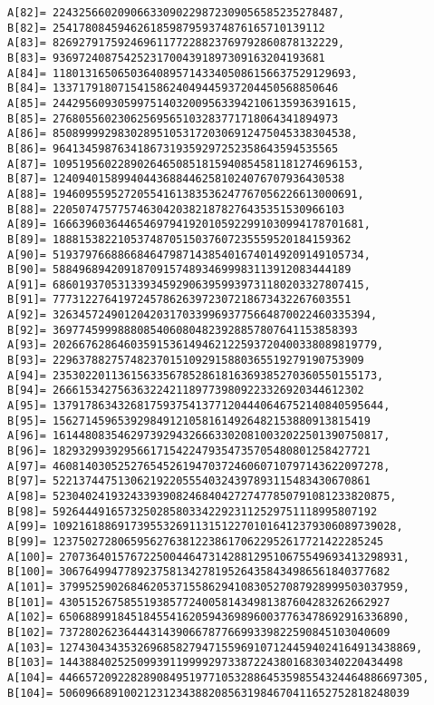 \documentclass[a4paper]{article}
\begin{document}
\begin{verbatim}
A[82]= 22432566020906633090229872309056585235278487, 
B[82]= 254178084594626185987959374876165710139112
A[83]= 82692791759246961177228823769792860878132229, 
B[83]= 936972408754252317004391897309163204193681
A[84]= 1180131650650364089571433405086156637529129693, 
B[84]= 13371791807154158624049445937204450568850646
A[85]= 2442956093059975140320095633942106135936391615, 
B[85]= 27680556023062569565103283771718064341894973
A[86]= 8508999929830289510531720306912475045338304538, 
B[86]= 96413459876341867319359297252358643594535565
A[87]= 10951956022890264650851815940854581181274696153, 
B[87]= 124094015899404436884462581024076707936430538
A[88]= 19460955952720554161383536247767056226613000691, 
B[88]= 220507475775746304203821878276435351530966103
A[89]= 166639603644654697941920105922991030994178701681, 
B[89]= 1888153822105374870515037607235559520184159362
A[90]= 519379766886684647987143854016740149209149105734, 
B[90]= 5884968942091870915748934699983113912083444189
A[91]= 686019370531339345929063959939731180203327807415, 
B[91]= 7773122764197245786263972307218673432267603551
A[92]= 3263457249012042031703399693775664870022460335394, 
B[92]= 36977459998880854060804823928857807641153858393
A[93]= 20266762864603591536149462122593720400338089819779, 
B[93]= 229637882757482370151092915880365519279190753909
A[94]= 23530220113615633567852861816369385270360550155173, 
B[94]= 266615342756363224211897739809223326920344612302
A[95]= 137917863432681759375413771204440646752140840595644, 
B[95]= 1562714596539298491210581614926482153880913815419
A[96]= 161448083546297392943266633020810032022501390750817, 
B[96]= 1829329939295661715422479354735705480801258427721
A[97]= 460814030525276545261947037246060710797143622097278, 
B[97]= 5221374475130621922055540324397893115483430670861
A[98]= 5230402419324339390824684042727477850791081233820875, 
B[98]= 59264449165732502858033422923112529751118995807192
A[99]= 10921618869173955326911315122701016412379306089739028, 
B[99]= 123750272806595627638122386170622952617721422285245
A[100]= 27073640157672250044647314288129510675549693413298931, 
B[100]= 306764994778923758134278195264358434986561840377682
A[101]= 37995259026846205371558629410830527087928999503037959, 
B[101]= 430515267585519385772400581434981387604283262662927
A[102]= 65068899184518455416205943698960037763478692916336890, 
B[102]= 737280262364443143906678776699339822590845103040609
A[103]= 1274304343532696858279471559691071244594024164913438869, 
B[103]= 14438840252509939119999297338722438016830340220434498
A[104]= 44665720922828908495197710532886453598554324464886697305, 
B[104]= 506096689100212312343882085631984670411652752818248039

\end{verbatim}
\end{document}
